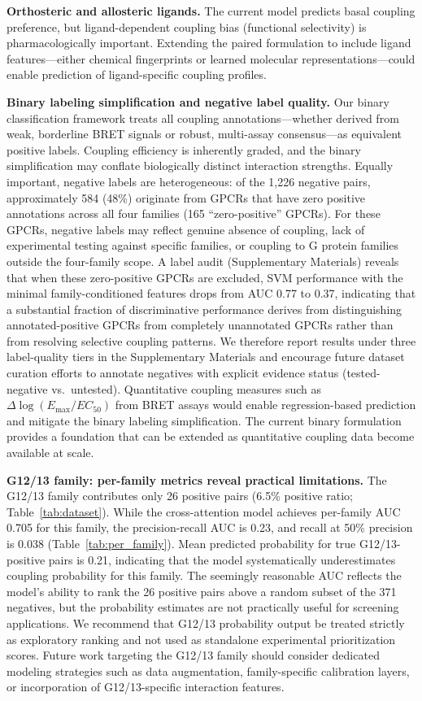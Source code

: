 \documentclass[11pt,a4paper]{article}
\begin{document}
\textbf{Orthosteric and allosteric ligands.} The current model predicts basal coupling preference, but ligand-dependent coupling bias (functional selectivity) is pharmacologically important. Extending the paired formulation to include ligand features---either chemical fingerprints or learned molecular representations---could enable prediction of ligand-specific coupling profiles.

\textbf{Binary labeling simplification and negative label quality.} Our binary classification framework treats all coupling annotations---whether derived from weak, borderline BRET signals or robust, multi-assay consensus---as equivalent positive labels. Coupling efficiency is inherently graded, and the binary simplification may conflate biologically distinct interaction strengths. Equally important, negative labels are heterogeneous: of the 1,226 negative pairs, approximately 584 (48\%) originate from GPCRs that have zero positive annotations across all four families (165 ``zero-positive'' GPCRs). For these GPCRs, negative labels may reflect genuine absence of coupling, lack of experimental testing against specific families, or coupling to G protein families outside the four-family scope. A label audit (Supplementary Materials) reveals that when these zero-positive GPCRs are excluded, SVM performance with the minimal family-conditioned features drops from AUC 0.77 to 0.37, indicating that a substantial fraction of discriminative performance derives from distinguishing annotated-positive GPCRs from completely unannotated GPCRs rather than from resolving selective coupling patterns. We therefore report results under three label-quality tiers in the Supplementary Materials and encourage future dataset curation efforts to annotate negatives with explicit evidence status (tested-negative vs.\ untested). Quantitative coupling measures such as $\Delta \log(E_{\text{max}}/EC_{50})$ from BRET assays would enable regression-based prediction and mitigate the binary labeling simplification. The current binary formulation provides a foundation that can be extended as quantitative coupling data become available at scale.

\textbf{G12/13 family: per-family metrics reveal practical limitations.} The G12/13 family contributes only 26 positive pairs (6.5\% positive ratio; Table~\ref{tab:dataset}). While the cross-attention model achieves per-family AUC 0.705 for this family, the precision-recall AUC is 0.23, and recall at 50\% precision is 0.038 (Table~\ref{tab:per_family}). Mean predicted probability for true G12/13-positive pairs is 0.21, indicating that the model systematically underestimates coupling probability for this family. The seemingly reasonable AUC reflects the model's ability to rank the 26 positive pairs above a random subset of the 371 negatives, but the probability estimates are not practically useful for screening applications. We recommend that G12/13 probability output be treated strictly as exploratory ranking and not used as standalone experimental prioritization scores. Future work targeting the G12/13 family should consider dedicated modeling strategies such as data augmentation, family-specific calibration layers, or incorporation of G12/13-specific interaction features.
\end{document}
